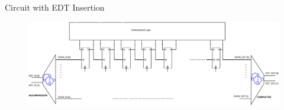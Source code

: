 \begin{frame}{Circuit with EDT Insertion}
\begin{figure}
\begin{center}
\label{fig:scan-mode}
\includegraphics[scale=0.2]{fig/EDT.pdf}
\end{center}
\end{figure}
\end{frame}


